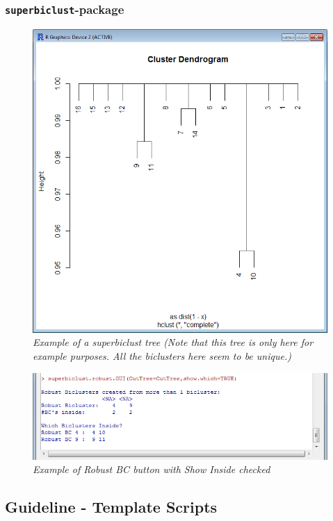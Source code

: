 \documentclass[a4paper]{article}\usepackage[]{graphicx}\usepackage[]{color}
\begin{document}
\subsubsection{\texttt{superbiclust}-package}
\begin{figure}[H]
\centering
\includegraphics[scale=0.5]{figures/superbiclust_example1.png}
\caption{{\it Example of a superbiclust tree (Note that this tree is only here
for example purposes. All the biclusters here seem to be unique.)}\label{superbiclust_example1}}
\end{figure}
\begin{figure}[H]
\centering
\includegraphics[scale=0.5]{figures/superbiclust_example2.png}
\caption{{\it Example of Robust BC button with Show Inside
checked}\label{superbiclust_example2}}
\end{figure}

\subsection{Guideline - Template Scripts}
\end{document}
